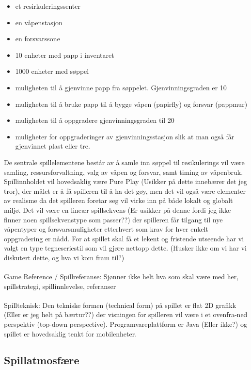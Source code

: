 \begin{itemize}
	\item et resirkuleringssenter
	\item en våpenstasjon
	\item en forsvarssone
	\item 10 enheter med papp i inventaret
	\item 1000 enheter med søppel
	\item muligheten til å gjenvinne papp fra søppelet. Gjenvinningsgraden er 10%
	\item muligheten til å bruke papp til å bygge våpen (papirfly) og forsvar (pappmur)
	\item muligheten til å oppgradere gjenvinningsgraden til 20%
	\item muligheter for oppgraderinger av gjenvinningsstasjon slik at man også får gjenvinnet plast eller tre.
\end{itemize}


De sentrale spillelementene består av å samle inn søppel til resikulerings vil være samling, ressursforvaltning, valg av våpen og forsvar, samt timing av våpenbruk. Spillinnholdet vil hovedsaklig være Pure Play (Usikker på dette innebærer det jeg tror), der målet er å få spilleren til å ha det gøy, men det vil også være elementer av realisme da det spilleren foretar seg vil virke inn på både lokalt og globalt miljø. Det vil være en lineær spillsekvens (Er usikker på denne fordi jeg ikke finner noen  spillsekvenstype som passer??) der spilleren får tilgang til nye våpentyper og forsvarsmuligheter etterhvert som krav for hver enkelt oppgradering er nådd. For at spillet skal få et lekent og fristende utseende har vi valgt en type tegneseriestil som vil gjøre nettopp dette. (Husker ikke om vi har vi diskutert dette, og hva vi kom fram til?)\\ 
\\
Game Reference / Spillreferanse: Sjønner ikke helt hva som skal være med her, spillstrategi, spillinnlevelse, referanser\\
\\
Spillteknisk: Den tekniske formen (technical form) på spillet er flat 2D grafikk (Eller er jeg helt på bærtur??) der visningen for spilleren vil være i et ovenfra-ned perspektiv (top-down perspective). Programvareplattform er Java (Eller ikke?) og spillet er hovedsaklig tenkt for mobilenheter.

\subsection{Spillatmosfære}

